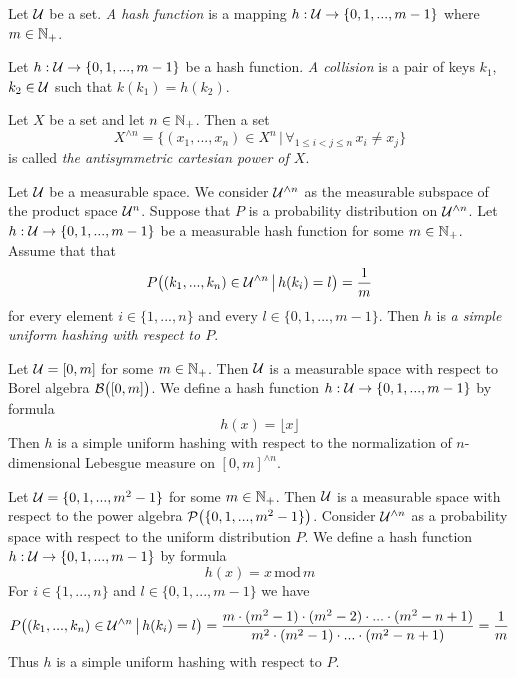 \begin{definition}
Let ${\mathcal U}$ be a set. \textit{A hash function} is a mapping $h:{\mathcal U}\rightarrow \{0,1,...,m-1\}$ where $m\in {\mathbb N}_+$.
\end{definition}

\begin{definition}
Let $h:{\mathcal U} \rightarrow \{0,1,...,m-1\}$ be a hash function. \textit{A collision} is a pair of keys $k_1$, $k_2\in {\mathcal U}$ such that $k(k_1) = h(k_2)$.
\end{definition}

\begin{definition}
Let $X$ be a set and let $n\in {\mathbb N}_+$. Then a set
$$X^{\wedge n} = \big\{(x_1,...,x_n)\in X^{n}\,\big|\,\forall_{1\leq i < j \leq n}\,x_i\neq x_j\big\}$$
is called \textit{the antisymmetric cartesian power of $X$}.
\end{definition}

\begin{definition}
Let ${\mathcal U}$ be a measurable space. We consider ${\mathcal U}^{\wedge n}$ as the measurable subspace of the product space ${\mathcal U}^{n}$. Suppose that $P$ is a probability distribution on ${\mathcal U}^{\wedge n}$. Let $h:{\mathcal U}\rightarrow \{0,1,...,m-1\}$ be a measurable hash function for some $m\in {\mathbb N}_+$. Assume that that
$$P\big((k_1,...,k_n)\in {\mathcal U}^{\wedge n}\,\big|\,h(k_i) = l\big) = \frac{1}{m}$$
for every element $i\in \{1,...,n\}$ and every $l\in \{0,1,...,m-1\}$. Then $h$ is \textit{a simple uniform hashing with respect to $P$}.
\end{definition}

\begin{example}\label{example:real_interval_with_floor_hash_function_as_an_example_of_suh}
Let ${\mathcal U} = [0,m]$ for some $m\in {\mathbb N}_+$. Then ${\mathcal U}$ is a measurable space with respect to Borel algebra ${\mathcal B}\big([0,m]\big)$. We define a hash function $h:{\mathcal U}\rightarrow \{0,1,...,m-1\}$ by formula
$$h(x) = \lfloor x \rfloor$$
Then $h$ is a simple uniform hashing with respect to the normalization of $n$-dimensional Lebesgue measure on $[0,m]^{\wedge n}$.
\end{example}

\begin{example}\label{example:interval_of_integers_with_modulo_hash_function_as_an_example_of_suh}
Let ${\mathcal U} = \{0,1,...,m^2-1\}$ for some $m\in {\mathbb N}_+$. Then ${\mathcal U}$ is a measurable space with respect to the power algebra ${\mathcal P}\big(\{0,1,...,m^2-1\}\big)$. Consider ${\mathcal U}^{\wedge n}$ as a probability space with respect to the uniform distribution $P$. We define a hash function $h:{\mathcal U} \rightarrow \{0,1,...,m-1\}$ by formula
$$h(x) = x\,\mathrm{mod}\,m$$
For $i\in \{1,...,n\}$ and $l\in \{0,1,...,m-1\}$ we have
$$P\big((k_1,...,k_n)\in {\mathcal U}^{\wedge n}\,\big|\,h(k_i) = l\big) = \frac{m\cdot (m^2 - 1)\cdot (m^2 - 2)\cdot ...\cdot (m^2 - n + 1)}{m^2\cdot (m^2 - 1)\cdot ...\cdot (m^2 - n + 1)} = \frac{1}{m}$$
Thus $h$ is a simple uniform hashing with respect to $P$.
\end{example}

